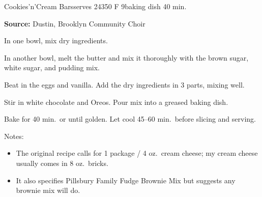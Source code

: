 \begin{recipe}{Cookies'n'Cream Bars}{serves 24}{350\0 F \hfill 9\inch{}\inch baking dish \hfill 40 min.}

 \freeform \textbf{Source:} Dustin, Brooklyn Community Choir

 In one bowl, mix dry ingredients.

 In another bowl, melt the butter and mix it thoroughly with the brown sugar, white sugar, and pudding mix.

 Beat in the eggs and vanilla. Add the dry ingredients in 3 parts, mixing well.

 Stir in white chocolate and Oreos. Pour mix into a greased baking dish.

 \newstep Bake for 40 min.\ or until golden. Let cool 45--60 min.\ before slicing and serving.

 \freeform Notes:
 \begin{itemize}
  \item The original recipe calls for 1 package / 4 oz.\ cream cheese; my cream cheese usually comes in 8 oz.\ bricks.
  \item It also specifies Pillsbury Family Fudge Brownie Mix but suggests any brownie mix will do.
 \end{itemize}
\end{recipe}
